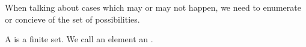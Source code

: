 

When talking about cases which
may or may not happen, we need
to enumerate or concieve of the
set of possibilities.


A 
is a finite set.
We call an element an .
